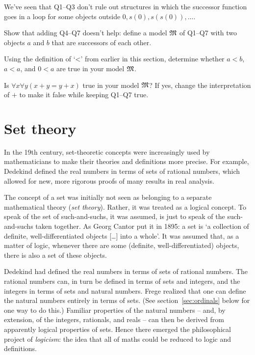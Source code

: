 \begin{exercise}
  We've seen that Q1--Q3 don't rule out
  structures in which the successor function goes in a loop
  for some objects outside $0, s(0), s(s(0)), \ldots$.
  \begin{cenumerate}
    \item[(a)] Show that adding Q4--Q7 doesn't help:
    define a model $\mathfrak{M}$ of Q1--Q7 with two objects $a$ and $b$
    that are successors of each other.
    \item[(b)] Using the definition of `<' from earlier in this section,
    determine whether $a<b$, $a<a$, and $0<a$ are true in your model $\mathfrak{M}$.
    \item[(c)] Is $\forall x \forall y (x+y = y+x)$ true in your model $\mathfrak{M}$?
    If yes, change the interpretation of $+$ to make it false while keeping Q1--Q7 true.
  \end{cenumerate}
\end{exercise}


\section{Set theory}\label{sec:zfc}

In the 19th century,
set-theoretic concepts were increasingly used by mathematicians
to make their theories and definitions more precise.
For example,
Dedekind defined the real numbers in terms of sets of rational numbers,
which allowed for new, more rigorous proofs of
many results in real analysis.

The concept of a set was initially not seen as belonging to a separate mathematical theory
(\emph{set theory}).
Rather, it was treated as a logical concept.
To speak of the set of such-and-suchs,
it was assumed,
is just to speak of the such-and-suchs taken together.
As Georg Cantor put it in 1895:
a set is `a collection of definite, well-differentiated objects [\ldots] into a whole'.
It was assumed that,
as a matter of logic,
whenever there are some (definite, well-differentiated) objects,
there is also a set of these objects.

Dedekind had defined the real numbers in terms of sets of rational numbers.
The rational numbers can, in turn be defined in terms of sets and integers,
and the integers in terms of sets and natural numbers.
Frege realized that
one can define the natural numbers entirely in terms of sets.
(See section~\ref{sec:ordinals} below for one way to do this.)
Familiar properties of the natural numbers
-- and, by extension, of the integers, rationals, and reals --
can then be derived from apparently logical properties of sets.
Hence there emerged the philosophical project of \emph{logicism}:
the idea that
all of maths could be reduced to logic and definitions.

